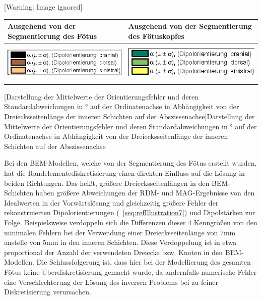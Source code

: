 \begin{center}
\begin{minipage}{17cm}


 [Warning: Image ignored] %
\begin{center}
\tablehead{}
\begin{supertabular}{|m{8.3cm}|m{8.3cm}|}
\hline
Ausgehend von der Segmentierung des Fötus &
Ausgehend von der Segmentierung des Fötuskopfes\\\hline
\includegraphics[width=8.304cm,height=1.884cm]{BA-img/BA-img25.png} &
\includegraphics[width=8.304cm,height=1.85cm]{BA-img/BA-img26.png}\\\hline
\end{supertabular}
\end{center}
[Darstellung der Mittelwerte der Orientierungsfehler
und deren Standardabweichungen in ° auf der Ordinatenachse in
Abhängigkeit von der Dreiecksseitenlänge der inneren Schichten auf der
Abszissenachse]{Darstellung der Mittelwerte der Orientierungsfehler und
deren Standardabweichungen in ° auf der Ordinatenachse in Abhängigkeit
von der Dreiecksseitenlänge der inneren Schichten auf der
Abszissenachse}
\label{seq:refIllustration7}
\end{minipage}
\end{center}
Bei den BEM-Modellen, welche von der Segmentierung des Fötus erstellt
wurden, hat die Randelementediskretisierung einen direkten Einfluss auf
die Lösung in beiden Richtungen. Das heißt, größere
Dreiecksseitenlängen in den BEM-Schichten haben größere Abweichungen
der RDM- und MAG-Ergebnisse von den Idealwerten in der Vorwärtslösung
und gleichzeitig größere Fehler der rekonstruierten Dipolorientierungen
(\figurename~\ref{seq:refIllustration7}) und Dipolstärken zur Folge.
Beispielsweise verdoppeln sich die Differenzen dieser 4 Kenngrößen von
den minimalen Fehlern bei der Verwendung einer Dreiecksseitenlänge von
7mm anstelle von 5mm in den inneren Schichten. Diese Verdoppelung ist
in etwa proportional der Anzahl der verwendeten Dreiecke bzw. Knoten in
den BEM-Modellen. Die Schlussfolgerung ist, dass hier bei der
Modellierung des gesamten Fötus keine Überdiskretisierung gemacht
wurde, da andernfalls numerische Fehler eine Verschlechterung der
Lösung des inversen Problems bei zu feiner Diskretisierung verursachen.

